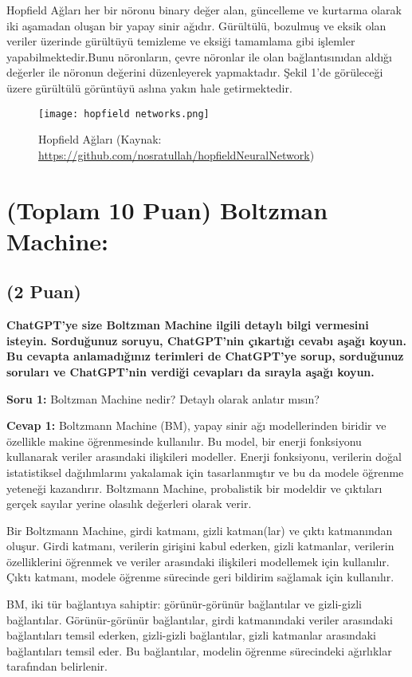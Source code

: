 \documentclass[11pt]{article}
\begin{document}
Hopfield Ağları her bir nöronu binary değer alan, güncelleme ve kurtarma olarak iki aşamadan oluşan bir yapay sinir ağıdır. Gürültülü, bozulmuş ve eksik olan veriler üzerinde gürültüyü temizleme ve eksiği tamamlama gibi işlemler yapabilmektedir.Bunu nöronların, çevre nöronlar ile olan bağlantısınıdan aldığı değerler ile nöronun değerini düzenleyerek yapmaktadır. Şekil 1'de görüleceği üzere gürültülü görüntüyü aslına yakın hale getirmektedir.
\begin{figure}[h]
  \centering
  \shorthandoff{=}
  \texttt{[image: hopfield networks.png]}
  \shorthandoff{=}
  \caption[Şekil 1]{Hopfield Ağları (Kaynak: \url{https://github.com/nosratullah/hopfieldNeuralNetwork})}
  \label{fig:Şekil 1}
\end{figure}
\newpage

\section{(Toplam 10 Puan) Boltzman Machine:}

\subsection{(2 Puan)} \textbf{ChatGPT’ye size Boltzman Machine ilgili detaylı bilgi vermesini isteyin. Sorduğunuz soruyu, ChatGPT'nin çıkartığı cevabı aşağı koyun. Bu cevapta anlamadığınız terimleri de ChatGPT’ye sorup, sorduğunuz soruları ve ChatGPT’nin verdiği cevapları da sırayla aşağı koyun.}

\textbf{Soru 1: } Boltzman Machine nedir? Detaylı olarak anlatır mısın?

\textbf{Cevap 1: } Boltzmann Machine (BM), yapay sinir ağı modellerinden biridir ve özellikle makine öğrenmesinde kullanılır. Bu model, bir enerji fonksiyonu kullanarak veriler arasındaki ilişkileri modeller. Enerji fonksiyonu, verilerin doğal istatistiksel dağılımlarını yakalamak için tasarlanmıştır ve bu da modele öğrenme yeteneği kazandırır. Boltzmann Machine, probalistik bir modeldir ve çıktıları gerçek sayılar yerine olasılık değerleri olarak verir.

Bir Boltzmann Machine, girdi katmanı, gizli katman(lar) ve çıktı katmanından oluşur. Girdi katmanı, verilerin girişini kabul ederken, gizli katmanlar, verilerin özelliklerini öğrenmek ve veriler arasındaki ilişkileri modellemek için kullanılır. Çıktı katmanı, modele öğrenme sürecinde geri bildirim sağlamak için kullanılır.

BM, iki tür bağlantıya sahiptir: görünür-görünür bağlantılar ve gizli-gizli bağlantılar. Görünür-görünür bağlantılar, girdi katmanındaki veriler arasındaki bağlantıları temsil ederken, gizli-gizli bağlantılar, gizli katmanlar arasındaki bağlantıları temsil eder. Bu bağlantılar, modelin öğrenme sürecindeki ağırlıklar tarafından belirlenir.
\end{document}
